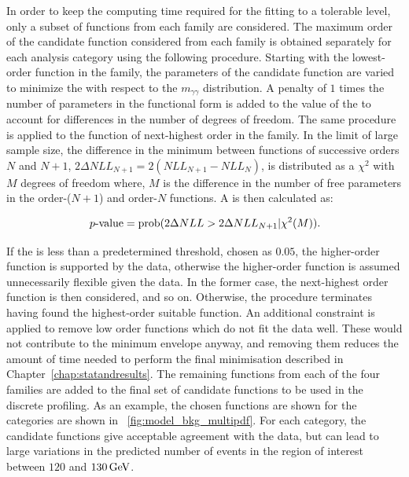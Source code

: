 In order to keep the computing time required for the fitting to a tolerable level, only a subset of functions from each family are considered. The maximum order of the candidate function considered from each family is obtained separately for each analysis category using the following procedure. Starting with the lowest-order function in the family, the parameters of the candidate function are varied to minimize the \NLL with respect to the $m_{\gamma\gamma}$ distribution. A penalty of $1$ times the number of parameters in the functional form is added to the value of the \NLL to account for differences in the number of degrees of freedom. The same procedure is applied to the function of next-highest order in the family. 
In the limit of large sample size, the difference in the minimum \NLL between functions of successive orders $N$ and $N+1$, $2 \Delta NLL_{N+1} = 2(NLL_{N+1} - NLL_{N})$, is distributed as a $\chi^2$ with $M$ degrees of freedom where, $M$ is the difference in the number of free parameters in the order-($N+1$) and order-$N$ functions. A \pvalue is then calculated as:

$$ \text{\ensuremath{\,p{\text{-value}}}} = \text{prob}(2 \Delta NLL > 2 \Delta NLL_{N+1}| \chi^2(M)). $$

If the \pvalue is less than a predetermined threshold, chosen as $0.05$, the higher-order function is supported by the data, otherwise the higher-order function is assumed unnecessarily flexible given the data. In the former case, the next-highest order function is then considered, and so on. Otherwise, the procedure terminates having found the highest-order suitable function. An additional constraint is applied to remove low order functions which do not fit the data well. These would not contribute to the minimum envelope anyway, and removing them reduces the amount of time needed to perform the final minimisation described in Chapter~\ref{chap:statandresults}. The remaining functions from each of the four families are added to the final set of candidate functions to be used in the discrete profiling. As an example, the chosen functions are shown for the \Untagged categories are shown in \Fig~\ref{fig:model_bkg_multipdf}. For each category, the candidate functions give acceptable agreement with the data, but can lead to large variations in the predicted number of events in the region of interest between $120$ and $130\,\text{Ge\hspace{-.08em}V}$. %

